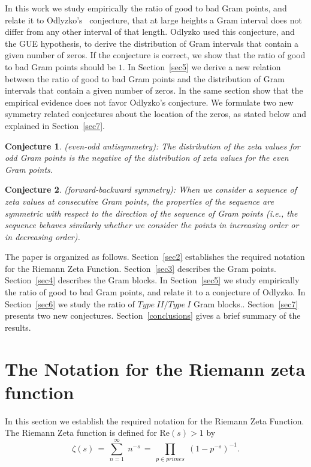 \documentclass[twoside]{article}
\newtheorem*{mydef-non}{Conjecture}
\begin{document}
In this work we study empirically the ratio of good to bad Gram points, and relate it to Odlyzko's~\cite{Odlyzko 1992} conjecture,  that at large heights a Gram interval does not differ from any other interval of that length. Odlyzko used this conjecture, and the GUE hypothesis, to derive the distribution of Gram intervals that contain a given number of zeros.
If the conjecture is correct, we show that the ratio of good to bad Gram points should be $1$. In Section~\ref{sec5} we derive a new relation between the ratio of good to bad Gram points and the distribution of Gram intervals that contain a given number of zeros. In the same section show that the empirical evidence does not favor Odlyzko's conjecture.  We formulate two new symmetry related conjectures about the location of the zeros, as stated below and explained in Section~\ref{sec7}.

\begin{mydef-non}\label{antisymmetry0}
(even-odd antisymmetry): The distribution of the zeta values for odd Gram points is the negative of the distribution of zeta values for the even Gram points.
\end{mydef-non}
\begin{mydef-non}\label{symmetry0}
(forward-backward symmetry): When we consider a sequence of zeta values at consecutive Gram points, the properties of the sequence are symmetric with respect to the direction of the sequence of Gram points (i.e., the sequence behaves similarly whether we consider the points in increasing order or in decreasing order).
\end{mydef-non}

The paper is organized as follows.
Section~\ref{sec2} establishes the required notation for the 
Riemann Zeta Function. 
Section~\ref{sec3} describes the Gram points. 
Section~\ref{sec4} describes the Gram blocks. 
In Section~\ref{sec5} we study empirically the ratio of good to bad Gram points, and relate it to a conjecture of Odlyzko. 
In Section~\ref{sec6} we study the ratio of $Type~II/Type~I$ Gram blocks.. 
Section~\ref{sec7} presents two new conjectures. 
Section~\ref{conclusions} gives a brief summary of the results. 

\section{\label{sec2}The Notation for the Riemann zeta function }

In this section we  establish the required notation for the 
Riemann Zeta Function. 
The Riemann Zeta function is defined for $\mathrm{Re} (s) > 1$ by
\begin{equation}
\zeta ( s ) \, = \, \sum^{\infty}_{n = 1} \; n^{-s} \, = \, \prod_{p \in primes} \;
\left( 1 - p^{-s} \right)^{-1}.
\label{eqRie}
\end{equation}
\end{document}
